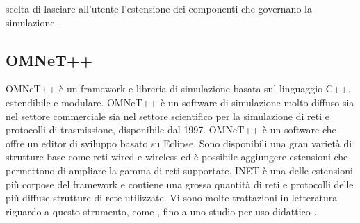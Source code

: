scelta di lasciare all’utente l’estensione dei componenti che governano la simulazione.
\bigskip

\subsection{OMNeT++}
OMNeT++ è un framework e libreria di simulazione basata sul linguaggio C++, estendibile e modulare. OMNeT++ è un software di simulazione molto diffuso sia nel settore commerciale sia nel settore scientifico per la simulazione di reti e protocolli di trasmissione, disponibile dal 1997. OMNeT++ è un software che offre un editor di sviluppo basato su Eclipse. Sono disponibili una gran varietà di strutture base come reti wired e wireless ed è possibile aggiungere estensioni che permettono di ampliare la gamma di reti supportate. INET è una delle estensioni più corpose del framework e contiene una grossa quantità di reti e protocolli delle più diffuse strutture di rete utilizzate. Vi sono molte trattazioni in letteratura riguardo a questo strumento, come \cite{omnet2010-book}, \cite{omnet2002-overview} fino a uno studio per uso didattico \cite{omnet2002-edu}.

